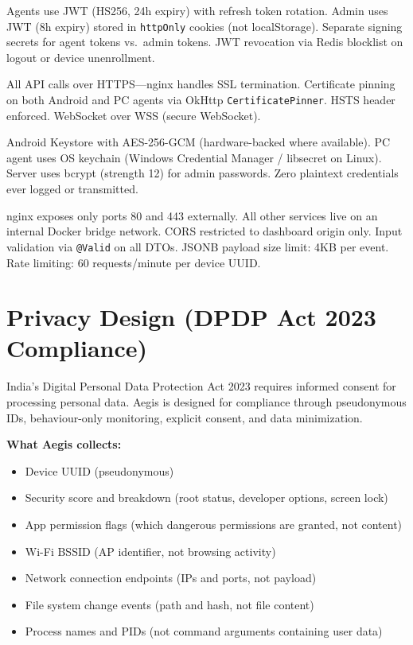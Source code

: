 \documentclass[12pt,a4paper]{report}
\begin{document}
\begin{description}[leftmargin=*, noitemsep]
  \item[Authentication:] Agents use JWT (HS256, 24h expiry) with refresh token rotation. Admin uses JWT (8h expiry) stored in \texttt{httpOnly} cookies (not localStorage). Separate signing secrets for agent tokens vs.\ admin tokens. JWT revocation via Redis blocklist on logout or device unenrollment.

  \item[Transport Security:] All API calls over HTTPS—nginx handles SSL termination. Certificate pinning on both Android and PC agents via OkHttp \texttt{CertificatePinner}. HSTS header enforced. WebSocket over WSS (secure WebSocket).

  \item[Credential Storage:] Android Keystore with AES-256-GCM (hardware-backed where available). PC agent uses OS keychain (Windows Credential Manager / libsecret on Linux). Server uses bcrypt (strength 12) for admin passwords. Zero plaintext credentials ever logged or transmitted.

  \item[Server Hardening:] nginx exposes only ports 80 and 443 externally. All other services live on an internal Docker bridge network. CORS restricted to dashboard origin only. Input validation via \texttt{@Valid} on all DTOs. JSONB payload size limit: 4KB per event. Rate limiting: 60 requests/minute per device UUID.
\end{description}

\section{Privacy Design (DPDP Act 2023 Compliance)}

India's Digital Personal Data Protection Act 2023 requires informed consent for processing personal data. Aegis is designed for compliance through pseudonymous IDs, behaviour-only monitoring, explicit consent, and data minimization.

\textbf{What Aegis collects:}
\begin{itemize}[leftmargin=*, noitemsep]
  \item Device UUID (pseudonymous)
  \item Security score and breakdown (root status, developer options, screen lock)
  \item App permission flags (which dangerous permissions are granted, not content)
  \item Wi-Fi BSSID (AP identifier, not browsing activity)
  \item Network connection endpoints (IPs and ports, not payload)
  \item File system change events (path and hash, not file content)
  \item Process names and PIDs (not command arguments containing user data)
\end{itemize}
\end{document}
